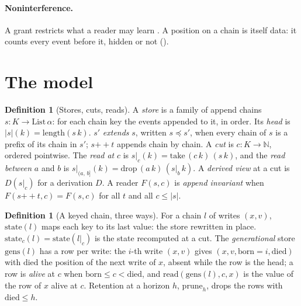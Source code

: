 \documentclass[11pt]{article}
\theoremstyle{plain}
\theoremstyle{definition}
\newtheorem{definition}[theorem]{Definition}
\newcommand{\N}{\mathbb{N}}
\newcommand{\at}[2]{#1|_{#2}}
\newcommand{\btw}[3]{#1|_{(#2,\,#3]}}
\newcommand{\hd}[1]{\lvert #1 \rvert}
\newcommand{\pre}{\preceq}
\begin{document}
\paragraph{Noninterference.}
A grant restricts what a reader may learn \cite{goguen1982security}. A position on a chain is
itself data: it counts every event before it, hidden or not ().

\section{The model}\label{sec:model}

\begin{definition}[Stores, cuts, reads]
A \emph{store} is a family of append chains $s : K \to \mathrm{List}\,\alpha$: for each chain key
the events appended to it, in order. Its \emph{head} is $\hd{s}(k) = \mathrm{length}(s\,k)$.
$s'$ \emph{extends} $s$, written $s \pre s'$, when every chain of $s$ is a prefix of its chain in
$s'$; $s \mathbin{+\!\!+} t$ appends chain by chain. A \emph{cut} is $c : K \to \N$, ordered
pointwise. The \emph{read at} $c$ is $\at{s}{c}(k) = \mathrm{take}\,(c\,k)\,(s\,k)$, and the
\emph{read between} $a$ and $b$ is $\btw{s}{a}{b}(k) = \mathrm{drop}\,(a\,k)\,(\at{s}{b}\,k)$. A
\emph{derived view} at a cut is $D(\at{s}{c})$ for a derivation $D$. A reader $F(s, c)$ is
\emph{append invariant} when $F(s \mathbin{+\!\!+} t, c) = F(s, c)$ for all $t$ and all
$c \le \hd{s}$.
\end{definition}

\begin{definition}[A keyed chain, three ways]
For a chain $l$ of writes $(x, v)$, $\mathrm{state}(l)$ maps each key to its last value: the store
rewritten in place. $\mathrm{state}_c(l) = \mathrm{state}(\at{l}{c})$ is the state recomputed at a
cut. The \emph{generational} store $\mathrm{gens}(l)$ has a row per write: the $i$-th write
$(x, v)$ gives $(x, v, \mathrm{born} = i, \mathrm{died})$ with $\mathrm{died}$ the position of
the next write of $x$, absent while the row is the head; a row is \emph{alive} at $c$ when
$\mathrm{born} \le c < \mathrm{died}$, and $\mathrm{read}(\mathrm{gens}(l), c, x)$ is the value of
the row of $x$ alive at $c$. Retention at a horizon $h$, $\mathrm{prune}_h$, drops the rows with
$\mathrm{died} \le h$.
\end{definition}
\end{document}
